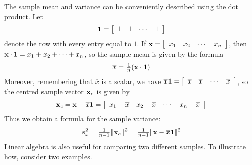 The sample mean and variance can be conveniently described using the dot product. Let
\begin{equation*}
\textbf{1} = 
\left[ \begin{array}{cccc}
1 & 1 & \cdots & 1
\end{array} \right]
\end{equation*}
denote the row with every entry equal to $1$. If $\textbf{x} = 
\left[ \begin{array}{cccc}
x_{1} & x_{2} & \cdots & x_{n}
\end{array} \right]$, then $\textbf{x} \cdot \textbf{1} = x_{1} + x_{2} + \dots + x_{n}$, so the sample mean is given by the formula
\begin{equation*}
\overline{x} = \tfrac{1}{n}(\textbf{x} \cdot \textbf{1})
\end{equation*}
Moreover, remembering that $\overline{x}$ is a scalar, we have
$\overline{x}\textbf{1} = 
\left[ \begin{array}{cccc}
\overline{x} & \overline{x} & \cdots & \overline{x}
\end{array} \right]$, so the centred sample vector $\textbf{x}_{c}$ is given by
\begin{equation*}
\textbf{x}_c = \textbf{x} - \overline{x}\textbf{1} = 
\left[ \begin{array}{cccc}
x_1 - \overline{x} &
x_2 - \overline{x} &
\cdots &
x_n - \overline{x} 
\end{array} \right]
\end{equation*}
Thus we obtain a formula for the sample variance:
\begin{equation*}
s_x^2 = \tfrac{1}{n - 1} \| \textbf{x}_c \|^2 = \tfrac{1}{n - 1} \| \textbf{x} - \overline{x}\textbf{1} \|^2
\end{equation*}
Linear algebra is also useful for comparing two different samples. To illustrate how, consider two examples.

\begin{wrapfigure}[8]{l}{5cm} 
\centering

\end{wrapfigure}

